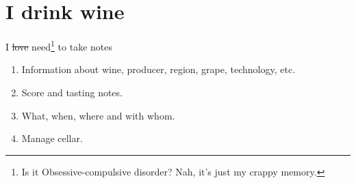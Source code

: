 \documentclass[presentation,aspectratio=169,smaller]{beamer}
\begin{document}
\section{I drink wine}
\label{sec:org6f3293b}

\begin{frame}[label={sec:orge124827}]{I \sout{love} need\footnote{Is it Obsessive-compulsive disorder? Nah, it's just my crappy memory.} to take notes}
\begin{enumerate}
\item Information about wine, producer, region, grape, technology, etc.
\item Score and tasting notes.
\item What, when, where and with whom.
\item Manage cellar.
\end{enumerate}
\end{frame}
\end{document}
